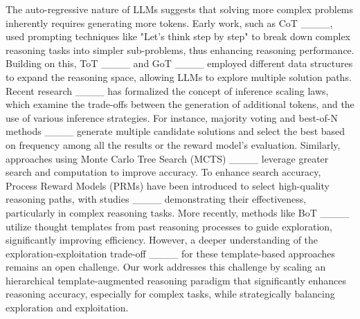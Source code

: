 The auto-regressive nature of LLMs suggests that solving more complex problems inherently requires generating more tokens. Early work, such as CoT ____, used prompting techniques like "Let's think step by step" to break down complex reasoning tasks into simpler sub-problems, thus enhancing reasoning performance. Building on this, ToT ____ and GoT ____ employed different data structures to expand the reasoning space, allowing LLMs to explore multiple solution paths. Recent research ____ has formalized the concept of inference scaling laws, which examine the trade-offs between the generation of additional tokens, and the use of various inference strategies. For instance, majority voting and best-of-N methods ____ generate multiple candidate solutions and select the best based on frequency among all the results or the reward model's evaluation.  Similarly, approaches using Monte Carlo Tree Search (MCTS) ____ leverage greater search and computation to improve accuracy. To enhance search accuracy, Process Reward Models (PRMs) have been introduced to select high-quality reasoning paths, with studies ____ demonstrating their effectiveness, particularly in complex reasoning tasks. 
More recently, methods like BoT ____ utilize thought templates from past reasoning processes to guide exploration, significantly improving efficiency. However, a deeper understanding of the exploration-exploitation trade-off ____ for these template-based approaches remains an open challenge. Our work addresses this challenge by scaling an hierarchical template-augmented reasoning paradigm that significantly enhances reasoning accuracy, especially for complex tasks, while strategically balancing exploration and exploitation.

